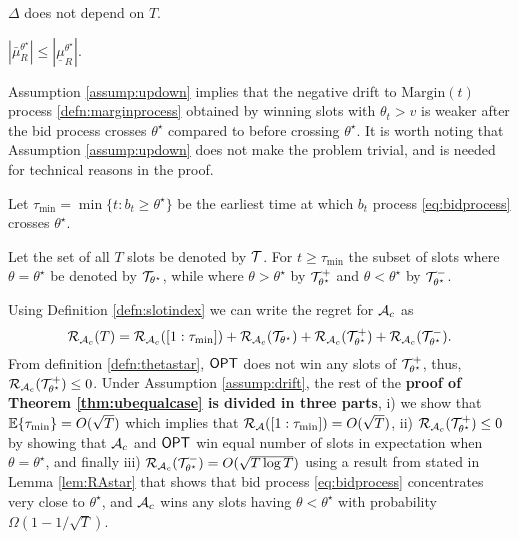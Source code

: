  \begin{assumption}\label{assump:drift} $\Delta$ does not depend on $T$.
 \end{assumption}
  \begin{assumption}\label{assump:updown} $|\bar {\mu}_R^{\theta^\star}| \le |\underline {\mu}_R^{\theta^\star}|$.
 \end{assumption}
Assumption \ref{assump:updown} implies that the negative drift to $\text{Margin}(t)$ process \eqref{defn:marginprocess} obtained by winning slots with $\theta_t > v$ is weaker after the bid process crosses $\theta^{\star}$ compared to before crossing $\theta^{\star}$.
 It is worth noting that Assumption \ref{assump:updown} does not make the problem trivial, and is needed for technical reasons in the proof.
 
 
  \begin{definition}
Let $\tau_{\min}= \min\{t: b_t \ge \theta^\star\}$ be the earliest time at which $b_t$ process \eqref{eq:bidprocess} crosses $\theta^\star$. 
\end{definition}
\begin{definition}\label{defn:slotindex}Let the set of all $T$ slots be denoted by $\mathcal{T}$. For $t\ge  \tau_{\min} $ the subset of slots where $\theta=\theta^\star$ be denoted by $\mathcal{T}_{\theta^\star}$, while where $\theta> \theta^\star$ by $\mathcal{T}^+_{\theta^\star}$ and $\theta< \theta^\star$ by $\mathcal{T}^{-}_{\theta^\star}$. 
\end{definition}

Using Definition \ref{defn:slotindex} we can write the regret for $\mathcal{A}_c$ as 
\begin{equation}\nonumber
\mathcal{R}_{\mathcal{A}_c}(T)= \mathcal{R}_{\mathcal{A}_c}([1:\tau_{\min}]) +   \mathcal{R}_{\mathcal{A}_c}( \mathcal{T}_{\theta^\star})  +  \mathcal{R}_{\mathcal{A}_c}(\mathcal{T}^+_{\theta^\star})+ \mathcal{R}_{\mathcal{A}_c}(\mathcal{T}^{-}_{\theta^\star}). 
\end{equation}
From definition \eqref{defn:thetastar}, $\mathsf{OPT}$ does not win any slots of $\mathcal{T}^+_{\theta^\star}$, thus, 
$\mathcal{R}_{\mathcal{A}_c}(\mathcal{T}^+_{\theta^\star})\le 0$.
Under Assumption \ref{assump:drift}, the rest of the {\bf proof of Theorem \ref{thm:ubequalcase} is divided in three parts}, i) we show that ${\mathbb{E}}\{\tau_{\min}\} = O(\sqrt{T})$ which implies that $\mathcal{R}_{\mathcal{A}}([1:\tau_{\min}])=O(\sqrt{T})$, ii) $\mathcal{R}_{\mathcal{A}_c}(\mathcal{T}^+_{\theta^\star})\le 0$  by showing that $\mathcal{A}_c$ and $\mathsf{OPT}$ win equal number of slots in expectation when $\theta = \theta^\star$, and finally iii) $\mathcal{R}_{\mathcal{A}_c}(\mathcal{T}^{-}_{\theta^\star}) = O(\sqrt{T \log T})$ using a result from \cite{Koksal} stated in Lemma \ref{lem:RAstar} that shows that bid process \eqref{eq:bidprocess} concentrates very close to $\theta^\star$, and $\mathcal{A}_c$ wins any slots having $\theta<\theta^\star$ with probability 
$\Omega(1-1/\sqrt{T})$.


